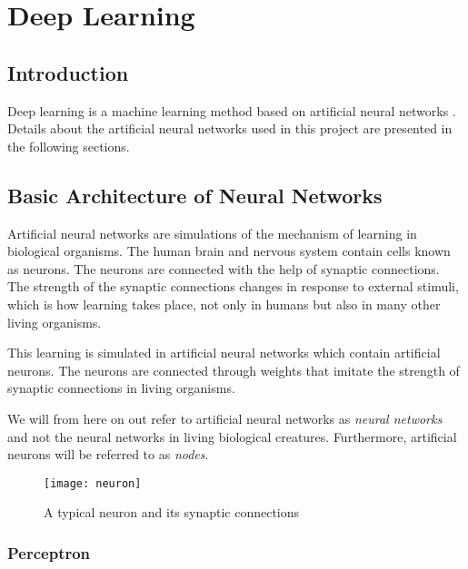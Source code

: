 \documentclass[titlepage]{article}
\begin{document}
\newpage

\section{Deep Learning}

\subsection{Introduction}

\vskip 0.2cm

Deep learning is a machine learning method based on artificial neural networks \cite{deeplearning}. Details about the artificial neural networks used in this project are presented in the following sections. 

\subsection{Basic Architecture of Neural Networks}

\vskip 0.2cm

Artificial neural networks \cite{charu} are simulations of the mechanism of learning in biological organisms. The human brain and nervous system contain cells known as neurons. The neurons are connected with the help of synaptic connections. The strength of the synaptic connections changes in response to external stimuli, which is how learning takes place, not only in humans but also in many other living organisms. 

\vskip 0.3cm

\noindent
This learning is simulated in artificial neural networks \cite{charu} which contain artificial neurons. The neurons are connected through weights that imitate the strength of synaptic connections in living organisms.

\vskip 0.3cm

\noindent
We will from here on out refer to artificial neural networks as \emph{neural networks} and not the neural networks in living biological creatures. Furthermore, artificial neurons will be referred to as \emph{nodes}.

\vskip 0.5cm

\begin{figure}[h]
    \centering
    \texttt{[image: neuron]}
    \caption{A typical neuron and its synaptic connections}
\end{figure}

\subsubsection{Perceptron}
\end{document}
